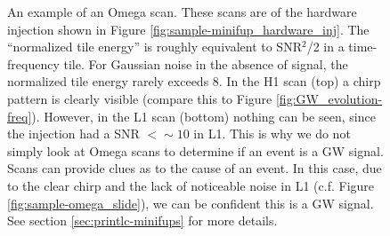 \begin{figure}[p]
\center
{}
\label{fig:sample-omega_hardware_inj}
\caption{An example of an Omega scan. These scans are of the hardware injection
shown in Figure \ref{fig:sample-minifup_hardware_inj}. The ``normalized tile
energy'' is roughly equivalent to SNR$^2$/2 in a time-frequency tile. For
Gaussian noise in the absence of signal, the normalized tile energy rarely
exceeds 8. In the H1 scan (top) a chirp pattern is clearly visible (compare
this to Figure \ref{fig:GW_evolution-freq}). However, in the L1 scan (bottom)
nothing can be seen, since the injection had a SNR $<\sim10$ in L1. This is
why we do not simply look at Omega scans to determine if an event is a GW
signal. Scans can provide clues as to the cause of an event. In this case, due
to the clear chirp and the lack of noticeable noise in L1 (c.f. Figure
\ref{fig:sample-omega_slide}), we can be confident this is a GW signal. See section
\ref{sec:printlc-minifups} for more details.}
\end{figure}

